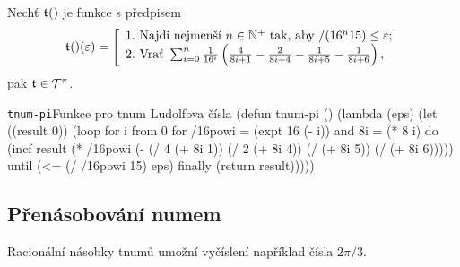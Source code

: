 \begin{consequence}
Nechť $\mathfrak{t}^{}()$ je funkce s předpisem 
\begin{equation}
\mathfrak{t}^{}()(\varepsilon)=\left[\begin{array}{l}
\mathrm{1.~}\text{Najdi~nejmenší~}n\in\mathbb{N}^+\text{~tak,~aby~}/(16^n15)\leq\varepsilon;\\
\mathrm{2.~}\text{Vrať~}\sum_{i=0}^n\frac{1}{16^i}\left(\frac{4}{8i+1}-\frac{2}{8i+4}-\frac{1}{8i+5}-\frac{1}{8i+6}\right),
\end{array}\right.
\end{equation} pak $\mathfrak{t}^{}\in\mathcal{T}^{\pi}$.
\end{consequence}
\begin{lispcode}{\texttt{tnum-pi}}{Funkce pro tnum Ludolfova čísla}
(\textcolor{funkcionalni}{defun} \textcolor{pojmenovan}{tnum-pi} ()
  (\textcolor{funkcionalni}{lambda} (eps)
    (\textcolor{vedlejsi}{let} ((result 0))
      (\textcolor{funkcionalni}{loop} \textcolor{obarvi}{for} i \textcolor{obarvi}{from} 0
            \textcolor{obarvi}{for} /16powi = (\textcolor{matematicke}{expt} 16 (\textcolor{matematicke}{-} i)) \textcolor{obarvi}{and} 8i = (\textcolor{matematicke}{*} 8 i)
            \textcolor{obarvi}{do} (\textcolor{vedlejsi}{incf} result 
                     (\textcolor{matematicke}{*} /16powi
                        (\textcolor{matematicke}{-} (\textcolor{matematicke}{/} 4 (\textcolor{matematicke}{+} 8i 1))
                           (\textcolor{matematicke}{/} 2 (\textcolor{matematicke}{+} 8i 4))
                           (\textcolor{matematicke}{/} (\textcolor{matematicke}{+} 8i 5))
                           (\textcolor{matematicke}{/} (\textcolor{matematicke}{+} 8i 6)))))
            \textcolor{obarvi}{until} (\textcolor{matematicke}{<=} (\textcolor{matematicke}{/} /16powi 15) eps)
            \textcolor{obarvi}{finally} (\textcolor{funkcionalni}{return} result)))))
\end{lispcode}

\subsection{Přenásobování numem}

Racionální násobky tnumů umožní vyčíslení například čísla $2\pi{/3}$.

